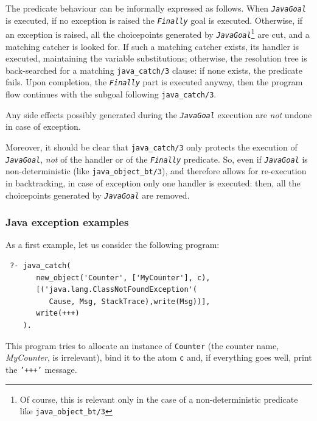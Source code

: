     The predicate behaviour can be informally expressed as follows. When \textit{\texttt{JavaGoal}} is executed, if no exception is raised
    the \texttt{\textit{Finally}} goal is executed.
    Otherwise, if an exception is raised, all the choicepoints generated by \textit{\texttt{JavaGoal}}\footnote{Of course, this is relevant only in the case of a non-deterministic predicate like \texttt{java\_object\_bt/3}} are cut, and a matching catcher is looked for. If such a matching catcher exists, its handler
    is executed, maintaining the variable substitutions; otherwise, the resolution tree is back-searched for a matching \texttt{java\_catch/3} clause: if none exists, the predicate fails.
    Upon completion, the \texttt{\textit{Finally}} part is executed anyway, then the program flow continues with the subgoal following \texttt{java\_catch/3}.

    Any side effects possibly generated during the \textit{\texttt{JavaGoal}} execution are \textit{not} undone in case of exception.

    Moreover, it should be clear that \texttt{java\_catch/3} only protects the execution of \texttt{\textit{JavaGoal}}, \textit{not} of the handler or of the \texttt{\textit{Finally}} predicate.
    So, even if \texttt{\textit{JavaGoal}} is non-deterministic (like \texttt{java\_object\_bt/3}), and therefore allows for re-execution in backtracking, in case of exception only one handler is executed: then, all the choicepoints generated by \texttt{\textit{JavaGoal}} are removed.

\subsubsection{Java exception examples}
\label{ssec:java-exception-examples}
As a first example, let us consider the following program:

\begin{verbatim}
 ?- java_catch(
       new_object('Counter', ['MyCounter'], c),
       [('java.lang.ClassNotFoundException'(
          Cause, Msg, StackTrace),write(Msg))],
       write(+++)
    ).
\end{verbatim}

\noindent This program tries to allocate an instance of \texttt{Counter} (the counter name, \textit{MyCounter}, is irrelevant), bind it to the atom \texttt{c} and, if everything goes well, print the \texttt{'+++'} message.

